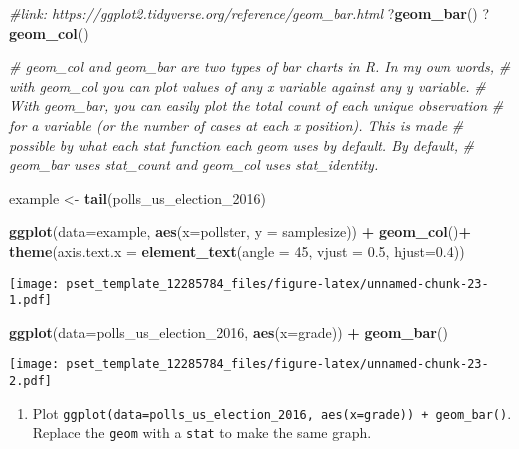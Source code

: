 \documentclass[
]{article}
\newenvironment{Shaded}{\begin{snugshade}}{\end{snugshade}}
\newcommand{\CommentTok}[1]{\textcolor[rgb]{0.56,0.35,0.01}{\textit{#1}}}
\newcommand{\DataTypeTok}[1]{\textcolor[rgb]{0.13,0.29,0.53}{#1}}
\newcommand{\DecValTok}[1]{\textcolor[rgb]{0.00,0.00,0.81}{#1}}
\newcommand{\FloatTok}[1]{\textcolor[rgb]{0.00,0.00,0.81}{#1}}
\newcommand{\KeywordTok}[1]{\textcolor[rgb]{0.13,0.29,0.53}{\textbf{#1}}}
\newcommand{\NormalTok}[1]{#1}
\newcommand{\OperatorTok}[1]{\textcolor[rgb]{0.81,0.36,0.00}{\textbf{#1}}}
\newcommand{\StringTok}[1]{\textcolor[rgb]{0.31,0.60,0.02}{#1}}
\providecommand{\tightlist}{%
  \setlength{\itemsep}{0pt}\setlength{\parskip}{0pt}}
\begin{document}
\begin{Shaded}
\begin{Highlighting}[]
\CommentTok{#link: https://ggplot2.tidyverse.org/reference/geom_bar.html}
\NormalTok{?}\KeywordTok{geom_bar}\NormalTok{()}
\NormalTok{?}\KeywordTok{geom_col}\NormalTok{()}

\CommentTok{# geom_col and geom_bar are two types of bar charts in R. In my own words,}
\CommentTok{# with geom_col you can plot values of any x variable against any y variable.}
\CommentTok{# With geom_bar, you can easily plot the total count of each unique observation}
\CommentTok{# for a variable (or the number of cases at each x position). This is made}
\CommentTok{# possible by what each stat function each geom uses by default. By default,}
\CommentTok{# geom_bar uses stat_count and geom_col uses stat_identity.}

\NormalTok{example <-}\StringTok{ }\KeywordTok{tail}\NormalTok{(polls_us_election_}\DecValTok{2016}\NormalTok{)}
  
\KeywordTok{ggplot}\NormalTok{(}\DataTypeTok{data=}\NormalTok{example, }\KeywordTok{aes}\NormalTok{(}\DataTypeTok{x=}\NormalTok{pollster, }\DataTypeTok{y =}\NormalTok{ samplesize)) }\OperatorTok{+}\StringTok{ }\KeywordTok{geom_col}\NormalTok{()}\OperatorTok{+}\StringTok{ }
\StringTok{  }\KeywordTok{theme}\NormalTok{(}\DataTypeTok{axis.text.x =} \KeywordTok{element_text}\NormalTok{(}\DataTypeTok{angle =} \DecValTok{45}\NormalTok{, }\DataTypeTok{vjust =} \FloatTok{0.5}\NormalTok{, }\DataTypeTok{hjust=}\FloatTok{0.4}\NormalTok{))}
\end{Highlighting}
\end{Shaded}

\texttt{[image: pset\_template\_12285784\_files/figure-latex/unnamed-chunk-23-1.pdf]}

\begin{Shaded}
\begin{Highlighting}[]
\KeywordTok{ggplot}\NormalTok{(}\DataTypeTok{data=}\NormalTok{polls_us_election_}\DecValTok{2016}\NormalTok{, }\KeywordTok{aes}\NormalTok{(}\DataTypeTok{x=}\NormalTok{grade)) }\OperatorTok{+}\StringTok{ }\KeywordTok{geom_bar}\NormalTok{()}
\end{Highlighting}
\end{Shaded}

\texttt{[image: pset\_template\_12285784\_files/figure-latex/unnamed-chunk-23-2.pdf]}

\begin{enumerate}
\def\labelenumi{\arabic{enumi}.}
\tightlist
\item
  Plot
  \texttt{ggplot(data=polls\_us\_election\_2016,\ aes(x=grade))\ +\ geom\_bar()}.
  Replace the \texttt{geom} with a \texttt{stat} to make the same graph.
\end{enumerate}
\end{document}
